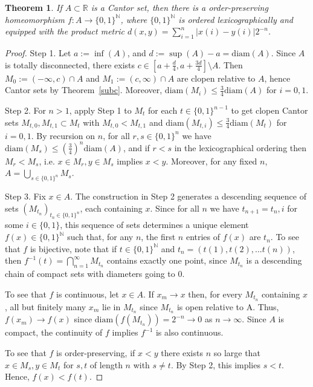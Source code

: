 \documentclass{article}
\newtheorem{theorem}{Theorem}
\newcommand{\diam}{\mathrm{diam}}
\newcommand{\N}{\mathbb{N}}
\begin{document}
\begin{theorem}\label{hom}
If $A \subset \mathbb{R}$ is a Cantor set, then there is a order-preserving homeomorphism $f:A \rightarrow {\{0,1\}}^\mathbb{N}$, where $\{0,1\}^\N$ is ordered lexicographically and equipped with the product metric $d(x,y) = \sum_{i=1}^n |x(i) - y(i)| 2^{-n}$.
\end{theorem}
\begin{proof}
Step 1. Let $a := \inf (A)$, and $d := \sup (A) - a = \mathrm{diam}(A)$. Since $A$ is totally disconnected, there exists $c \in [a + \frac d 4, a + \frac {3d} 4] \setminus A$. Then $M_0 := (-\infty, c) \cap A $ and $M_1 := (c, \infty) \cap A$ are clopen relative to $A$, hence Cantor sets by Theorem~\ref{subc}. Moreover, $\mathrm{diam}(M_i) \leq \frac 3 4 \mathrm{diam}(A)$ for $i = 0,1$.

Step 2. For $n > 1$, apply Step 1 to $M_t$ for each $t \in {\{0,1\}}^{n-1}$ to get clopen Cantor sets $M_{t,0}, M_{t,1} \subset M_t$ with $M_{t,0} < M_{t,1}$ and $\mathrm{diam}(M_{t,i}) \leq \frac 3 4 \mathrm{diam}(M_t)$ for $i=0,1$. By recursion on $n$, for all $r,s \in {\{0,1\}}^n$ we have $\mathrm{diam}(M_s) \leq \left(\frac 3 4\right)^n \mathrm{diam} (A)$, and if $r < s$ in the lexicographical ordering then $M_r < M_s$, i.e. $x \in M_r, y\in M_s$  implies $x < y$. Moreover, for any fixed $n$, $A = \bigcup_{s \in {\{0,1\}}^n} M_s$.

Step 3. Fix $x \in A$. The construction in Step 2 generates a descending sequence of sets ${\left(M_{t_n}\right)}_{t_n \in {\{0,1\}}^n}$, each containing $x$. Since for all $n$ we have $t_{n+1} =t_n,i$ for some $i \in \{0,1\}$, this sequence of sets determines a unique element $f(x) \in {\{0,1\}}^\mathbb{N}$ such that, for any $n$, the first $n$ entries of $f(x)$ are $t_n$. To see that $f$ is bijective, note that if $t \in {\{0,1\}}^\mathbb{N}$ and $t_n = (t(1), t(2), ... t(n))$, then $f^{-1}(t) = \bigcap_{n = 1}^\infty {M_{t_n}}$ contains exactly one point, since $M_{t_n}$ is a descending chain of compact sets with diameters going to $0$.

To see that $f$ is continuous, let $x \in A$. If $x_m \rightarrow x$ then, for every $M_{t_n}$ containing $x$, all but finitely many $x_m$ lie in $M_{t_n}$ since $M_{t_n}$ is open relative to A. Thus, $f(x_m) \rightarrow f(x)$ since $\diam(f(M_{t_n})) = 2^{-n} \rightarrow 0$ as $n \rightarrow \infty$. Since $A$ is compact, the continuity of $f$ implies $f^{-1}$ is also continuous.

To see that $f$ is order-preserving, if $x < y$ there exists $n$ so large that $x \in M_s, y \in M_t$ for $s,t$ of length $n$ with $s \neq t$. By Step 2, this implies $s < t$.
Hence, $f(x) < f(t)$.
\end{proof}
\end{document}
